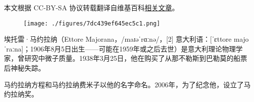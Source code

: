 
本文根据 CC-BY-SA 协议转载翻译自维基百科\href{https://en.wikipedia.org/wiki/Arthur_Compton}{相关文章}。

\begin{figure}[ht]
\centering
\texttt{[image: ./figures/7dc439ef645ec5c1.png]}
\caption{} \label{fig_ATL_1}
\end{figure}
埃托雷·马约拉纳（Ettore Majorana，/maɪəˈrɑːnə/，[2] 意大利语：[ˈɛttore majoˈraːna]；1906年8月5日出生——可能在1959年或之后去世）是意大利理论物理学家，曾研究中微子质量。1938年3月25日，他在购买了从那不勒斯到巴勒莫的船票后神秘失踪。

马约拉纳方程和马约拉纳费米子以他的名字命名。2006年，为了纪念他，设立了马约拉纳奖。
